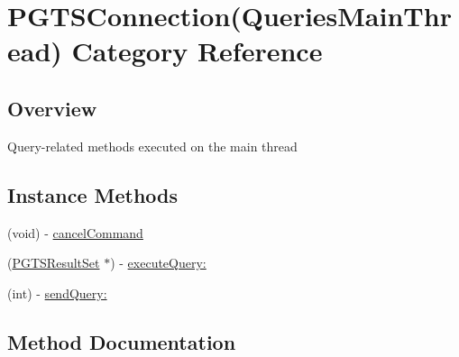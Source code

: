 \hypertarget{category_p_g_t_s_connection_07_queries_main_thread_08}{}\section{P\+G\+T\+S\+Connection(Queries\+Main\+Thread) Category Reference}
\label{category_p_g_t_s_connection_07_queries_main_thread_08}


\subsection{Overview}
Query-\/related methods executed on the main thread \subsection*{Instance Methods}
\begin{DoxyCompactItemize}
\item 
(void) -\/ \hyperlink{category_p_g_t_s_connection_07_queries_main_thread_08_a5c96541d27baa27effc4c41a34c6f7b5}{cancel\+Command}
\end{DoxyCompactItemize}
{\bf }\par
\begin{DoxyCompactItemize}
\item 
(\hyperlink{interface_p_g_t_s_result_set}{P\+G\+T\+S\+Result\+Set} $\ast$) -\/ \hyperlink{category_p_g_t_s_connection_07_queries_main_thread_08_a2a633972d078fea16192c57c5cb87514}{execute\+Query\+:}
\end{DoxyCompactItemize}

{\bf }\par
\begin{DoxyCompactItemize}
\item 
(int) -\/ \hyperlink{category_p_g_t_s_connection_07_queries_main_thread_08_a4376dcad5b13ea495f9237a26453642f}{send\+Query\+:}
\end{DoxyCompactItemize}



\subsection{Method Documentation}
\hypertarget{category_p_g_t_s_connection_07_queries_main_thread_08_a5c96541d27baa27effc4c41a34c6f7b5}{}
